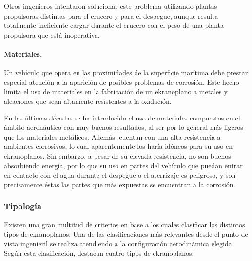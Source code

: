 Otros ingenieros intentaron solucionar este problema utilizando plantas propulsoras distintas para el crucero y para el despegue, aunque resulta totalmente ineficiente cargar durante el crucero con el peso de una planta propulsora que está inoperativa.

\paragraph{Materiales.} Un vehículo que opera en las proximidades de la superficie marítima debe prestar especial atención a la aparición de posibles problemas de corrosión. Este hecho limita el uso de materiales en la fabricación de un ekranoplano a metales y aleaciones que sean altamente resistentes a la oxidación.

En las últimas décadas se ha introducido el uso de materiales compuestos en el ámbito aeronáutico con muy buenos resultados, al ser por lo general más ligeros que los materiales metálicos. Además, cuentan con una alta resistencia a ambientes corrosivos, lo cual aparentemente los haría idóneos para su uso en ekranoplanos. Sin embargo, a pesar de su elevada resistencia, no son buenos absorbiendo energía, por lo que su uso en partes del vehículo que puedan entrar en contacto con el agua durante el despegue o el aterrizaje es peligroso, y son precisamente éstas las partes que más expuestas se encuentran a la corrosión.


\subsubsection{Tipología}
\label{sec:wig:ekranoplane:tipology}

Existen una gran multitud de criterios en base a los cuales clasificar los distintos tipos de ekranoplanos. Una de las clasificaciones más relevantes desde el punto de vista ingenieril se realiza atendiendo a la configuración aerodinámica elegida. Según esta clasificación, destacan cuatro tipos de ekranoplanos:

